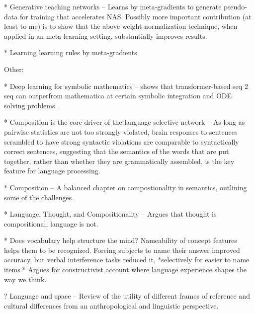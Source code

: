 * Generative teaching networks -- Learns by meta-gradients to generate pseudo-data for training that accelerates NAS. Possibly more important contribution (at least to me) is to show that the above weight-normalization technique, when applied in an meta-learning setting, substantially improves results. \citep{Such2019}

* Learning learning rules by meta-gradients \citep{Miconi2019}


Other:

* Deep learning for symbolic mathematics -- shows that transformer-based seq 2 seq can outperfrom mathematica at certain symbolic integration and ODE solving problems. \citep{Lample2019} 

* Composition is the core driver of the language-selective network -- As long as pairwise statistics are not too strongly violated, brain responses to sentences scrambled to have strong syntactic violations are comparable to syntactically correct sentences, suggesting that the semantics of the words that are put together, rather than whether they are grammatically assembled, is the key feature for language processing. \citep{Mollica2020}

* Composition -- A balanced chapter on compostionality in semantics, outlining some of the challenges. \citep{Goldberg2015}

* Language, Thought, and Compositionality -- Argues that thought is compositional, language is not. \citep{Fodor2001}

* Does vocabulary help structure the mind? Nameability of concept features helps them to be recognized. Forcing subjects to name their answer improved accuracy, but verbal interference tasks reduced it, *selectively for easier to name items.* Argues for constructivist account where language experience shapes the way we think. \citep{Lupyan2020}

? Language and space -- Review of the utility of different frames of reference and cultural differences from an anthropological and linguistic perspective. \citep{Levinson1996}
